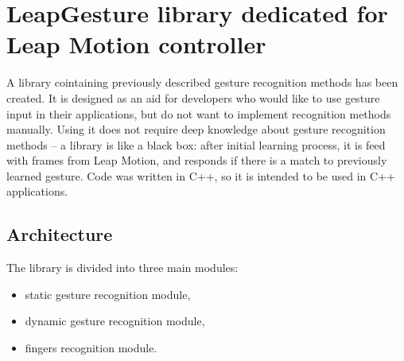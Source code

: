 
\chapter{LeapGesture library dedicated for Leap Motion controller}\label{libraryChapter}


A library cointaining previously described gesture recognition methods has been created. It is designed as an aid for developers who would like to use gesture input in their applications, but do not want to implement recognition methods manually. Using it does not require deep knowledge about gesture recognition methods -- a library is like a black box: after initial learning process, it is feed with frames from Leap Motion, and responds if there is a match to previously learned gesture. Code was written in C++, so it is intended to be used in C++ applications. 


\section{Architecture} \label{architectureSection}

The library is divided into three main modules:
\begin{itemize}
\item static gesture recognition module,
\item dynamic gesture recognition module,
\item fingers recognition module.
\end{itemize}

